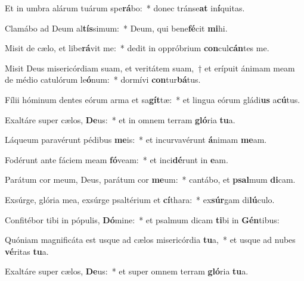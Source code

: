 \item Et in umbra alárum tuárum spe\textbf{rá}bo:~* donec tránse\textbf{at} in\textbf{í}quitas.
\item Clamábo ad Deum al\textbf{tís}simum:~* Deum, qui bene\textbf{fé}cit \textbf{mi}hi.
\item Misit de cælo, et libe\textbf{rá}vit me:~* dedit in oppróbrium \textbf{con}cul\textbf{cán}tes me.
\item Misit Deus misericórdiam suam, et veritátem suam,~† et erípuit ánimam meam de médio catulórum le\textbf{ó}num:~* dormívi \textbf{con}tur\textbf{bá}tus.
\item Fílii hóminum dentes eórum arma et sa\textbf{gít}tæ:~* et lingua eórum gládi\textbf{us} a\textbf{cú}tus.
\item Exaltáre super cælos, \textbf{De}us:~* et in omnem terram \textbf{gló}ria \textbf{tu}a.
\item Láqueum paravérunt pédibus \textbf{me}is:~* et incurvavérunt \textbf{á}nimam \textbf{me}am.
\item Fodérunt ante fáciem meam \textbf{fó}veam:~* et inci\textbf{dé}runt in \textbf{e}am.
\item Parátum cor meum, Deus, parátum cor \textbf{me}um:~* cantábo, et \textbf{psal}mum \textbf{di}cam.
\item Exsúrge, glória mea, exsúrge psaltérium et \textbf{cí}thara:~* ex\textbf{súr}gam di\textbf{lú}culo.
\item Confitébor tibi in pópulis, \textbf{Dó}mine:~* et psalmum dicam \textbf{ti}bi in \textbf{Gén}tibus:
\item Quóniam magnificáta est usque ad cælos misericórdia \textbf{tu}a,~* et usque ad nubes \textbf{vé}ritas \textbf{tu}a.
\item Exaltáre super cælos, \textbf{De}us:~* et super omnem terram \textbf{gló}ria \textbf{tu}a.
